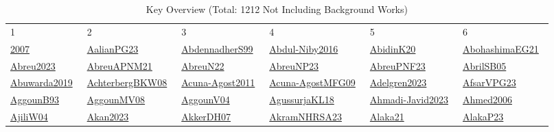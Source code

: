 \begin{longtable}{*{6}{l}}
\rowcolor{white}\caption{Key Overview (Total: 1212 Not Including Background Works)}\\ \toprule
\rowcolor{white}1 & 2 & 3 & 4 & 5 & 6\\ \midrule
\endhead
\bottomrule
\endfoot
\href{../}{2007}~\cite{2007} & \href{../scheduling/works/AalianPG23.pdf}{AalianPG23}~\cite{AalianPG23} & \href{../scheduling/works/AbdennadherS99.pdf}{AbdennadherS99}~\cite{AbdennadherS99} & \href{../scheduling/works/Abdul-Niby2016.pdf}{Abdul-Niby2016}~\cite{Abdul-Niby2016} & \href{../scheduling/works/AbidinK20.pdf}{AbidinK20}~\cite{AbidinK20} & \href{../scheduling/works/AbohashimaEG21.pdf}{AbohashimaEG21}~\cite{AbohashimaEG21}\\ 
\href{../scheduling/works/Abreu2023.pdf}{Abreu2023}~\cite{Abreu2023} & \href{../scheduling/works/AbreuAPNM21.pdf}{AbreuAPNM21}~\cite{AbreuAPNM21} & \href{../scheduling/works/AbreuN22.pdf}{AbreuN22}~\cite{AbreuN22} & \href{../scheduling/works/AbreuNP23.pdf}{AbreuNP23}~\cite{AbreuNP23} & \href{../scheduling/works/AbreuPNF23.pdf}{AbreuPNF23}~\cite{AbreuPNF23} & \href{../scheduling/works/AbrilSB05.pdf}{AbrilSB05}~\cite{AbrilSB05}\\ 
\href{../}{Abuwarda2019}~\cite{Abuwarda2019} & \href{../scheduling/works/AchterbergBKW08.pdf}{AchterbergBKW08}~\cite{AchterbergBKW08} & \href{../scheduling/works/Acuna-Agost2011.pdf}{Acuna-Agost2011}~\cite{Acuna-Agost2011} & \href{../scheduling/works/Acuna-AgostMFG09.pdf}{Acuna-AgostMFG09}~\cite{Acuna-AgostMFG09} & \href{../scheduling/works/Adelgren2023.pdf}{Adelgren2023}~\cite{Adelgren2023} & \href{../scheduling/works/AfsarVPG23.pdf}{AfsarVPG23}~\cite{AfsarVPG23}\\ 
\href{../scheduling/works/AggounB93.pdf}{AggounB93}~\cite{AggounB93} & \href{../}{AggounMV08}~\cite{AggounMV08} & \href{../}{AggounV04}~\cite{AggounV04} & \href{../scheduling/works/AgussurjaKL18.pdf}{AgussurjaKL18}~\cite{AgussurjaKL18} & \href{../}{Ahmadi-Javid2023}~\cite{Ahmadi-Javid2023} & \href{../scheduling/works/Ahmed2006.pdf}{Ahmed2006}~\cite{Ahmed2006}\\ 
\href{../}{AjiliW04}~\cite{AjiliW04} & \href{../scheduling/works/Akan2023.pdf}{Akan2023}~\cite{Akan2023} & \href{../scheduling/works/AkkerDH07.pdf}{AkkerDH07}~\cite{AkkerDH07} & \href{../scheduling/works/AkramNHRSA23.pdf}{AkramNHRSA23}~\cite{AkramNHRSA23} & \href{../scheduling/works/Alaka21.pdf}{Alaka21}~\cite{Alaka21} & \href{../scheduling/works/AlakaP23.pdf}{AlakaP23}~\cite{AlakaP23}\\ 

\end{longtable}
